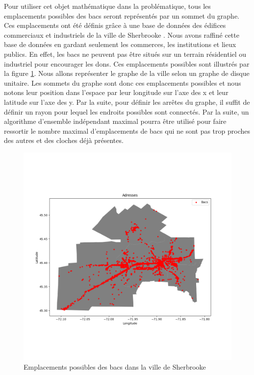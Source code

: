 \documentclass[11pt]{article}
\begin{document}
Pour utiliser cet objet mathématique dans la problématique, tous les emplacements possibles des bacs seront représentés par un sommet du graphe. Ces emplacements ont été définis grâce à une base de données des édifices commerciaux et industriels de la ville de Sherbrooke \cite{noauthor_repertoire_nodate}. Nous avons raffiné cette base de données en gardant seulement les commerces, les institutions et lieux publics. En effet, les bacs ne peuvent pas être situés sur un terrain résidentiel ou industriel pour encourager les dons. Ces emplacements possibles sont illustrés par la figure \ref{bacs_possibles_total}. Nous allons représenter le graphe de la ville selon un graphe de disque unitaire. Les sommets du graphe sont donc ces emplacements possibles et nous notons leur position dans l'espace par leur longitude sur l'axe des x et leur latitude sur l'axe des y. Par la suite, pour définir les arrêtes du graphe, il suffit de définir un rayon pour  lequel les endroits possibles sont connectés. Par la suite, un algorithme d'ensemble indépendant maximal pourra être utilisé pour faire ressortir le nombre maximal d'emplacements  de bacs qui ne sont pas trop proches des autres et des cloches déjà présentes.


 \begin{figure}[H]
    \centering
        \includegraphics[width=0.5\linewidth]{images/commerces.png}
        \caption{Emplacements possibles des bacs dans la ville de Sherbrooke}
    \label{bacs_possibles_total}
\end{figure}
\end{document}

